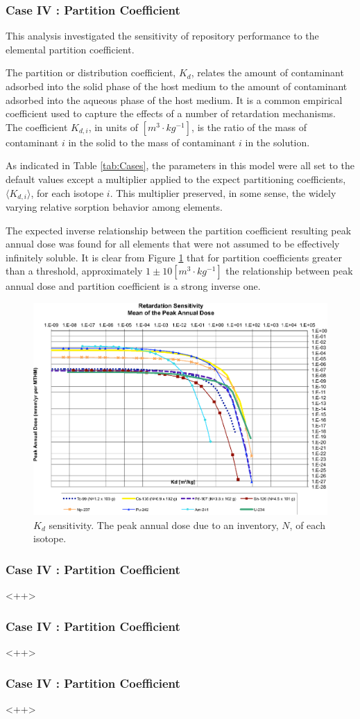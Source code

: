 

\begin{frame}[c]
  \frametitle{Case IV : Partition Coefficient}

This analysis investigated the sensitivity of repository performance
to the elemental partition coefficient. 

The partition or distribution coefficient, $K_d$, relates the amount of contaminant adsorbed into the 
solid phase of the host medium to the amount of contaminant adsorbed into the 
aqueous phase of the host medium. It is a common empirical coefficient used to 
capture the effects of a number of retardation mechanisms. The coefficient 
$K_{d,i}$, in units of $[m^3\cdot kg^{-1}]$, is the ratio of the mass of 
contaminant $i$ in the solid to the mass of contaminant $i$ in the solution.

As indicated in Table \ref{tab:Cases}, the parameters in this model were all set 
to the default values except a multiplier applied to the expect partitioning 
coefficients, $\langle K_{d,i} \rangle$, for each isotope $i$. This multiplier 
preserved, in some sense, the widely varying 
relative sorption behavior among elements. 

The expected inverse relationship between the partition coefficient resulting 
peak annual dose was found for all elements that were not assumed to be 
effectively infinitely soluble.  It is clear from Figure \ref{fig:KdSum} that 
for partition coefficients greater than a threshold, approximately 
  $1\pm10[m^3\cdot kg^{-1}]$ the relationship between 
peak annual dose and partition coefficient is a strong inverse one. 

\begin{figure}[ht]
  \centering
  \includegraphics[width=\linewidth]{Partitioning_Summary.eps}
  \caption{$K_d$ sensitivity.  The peak annual dose due to an inventory, 
  $N$, of each isotope.}
  \label{fig:KdSum}
\end{figure}
 
\end{frame}

\begin{frame}[c]
  \frametitle{Case IV : Partition Coefficient}
  <++>
\end{frame}

\begin{frame}[c]
  \frametitle{Case IV : Partition Coefficient}
  <++>
\end{frame}

\begin{frame}[c]
  \frametitle{Case IV : Partition Coefficient}
  <++>
\end{frame}
